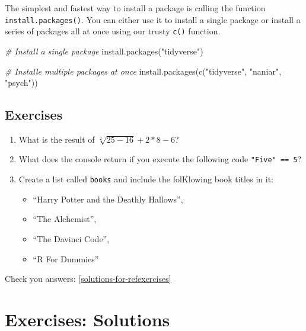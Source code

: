 \documentclass[
]{book}
\newenvironment{Shaded}{\begin{snugshade}}{\end{snugshade}}
\newcommand{\CommentTok}[1]{\textcolor[rgb]{0.56,0.35,0.01}{\textit{#1}}}
\newcommand{\FunctionTok}[1]{\textcolor[rgb]{0.00,0.00,0.00}{#1}}
\newcommand{\NormalTok}[1]{#1}
\newcommand{\StringTok}[1]{\textcolor[rgb]{0.31,0.60,0.02}{#1}}
\begin{document}
The simplest and fastest way to install a package is calling the function \texttt{install.packages()}. You can either use it to install a single package or install a series of packages all at once using our trusty \texttt{c()} function.

\begin{Shaded}
\begin{Highlighting}[]
\CommentTok{\# Install a single package}
\FunctionTok{install.packages}\NormalTok{(}\StringTok{"tidyverse"}\NormalTok{)}

\CommentTok{\# Installe multiple packages at once}
\FunctionTok{install.packages}\NormalTok{(}\FunctionTok{c}\NormalTok{(}\StringTok{"tidyverse"}\NormalTok{, }\StringTok{"naniar"}\NormalTok{, }\StringTok{"psych"}\NormalTok{))}
\end{Highlighting}
\end{Shaded}

\hypertarget{exercises-chapter-5}{%
\section{Exercises}\label{exercises-chapter-5}}

\begin{enumerate}
\def\labelenumi{\arabic{enumi}.}
\item
  What is the result of \(\sqrt[2]{25-16}+2*8-6\)?
\item
  What does the console return if you execute the following code \texttt{"Five"\ ==\ 5}?
\item
  Create a list called \texttt{books} and include the folKlowing book titles in it:

  \begin{itemize}
  \item
    ``Harry Potter and the Deathly Hallows'',
  \item
    ``The Alchemist'',
  \item
    ``The Davinci Code'',
  \item
    ``R For Dummies''
  \end{itemize}
\end{enumerate}

Check you answers: \ref{solutions-for-refexercises}

\hypertarget{exercises-solutions}{%
\chapter{Exercises: Solutions}\label{exercises-solutions}}
\end{document}

